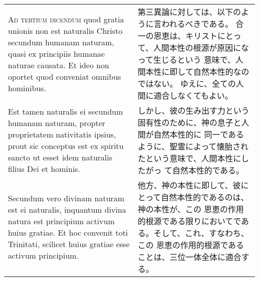 \documentclass[10pt]{jsarticle} %
\begin{document}
\begin{longtable}{p{21em}p{21em}}
\\



{\scshape Ad tertium dicendum} quod gratia unionis non est naturalis Christo
secundum humanam naturam, quasi ex principiis humanae naturae
causata. Et ideo non oportet quod conveniat omnibus hominibus.


&

第三異論に対しては、以下のように言われるべきである。
合一の恩恵は、キリストにとって、人間本性の根源が原因になって生じるという
 意味で、人間本性に即して自然本性的なのではない。
ゆえに、全ての人間に適合しなくてもよい。

\\

 Est tamen
naturalis ei secundum humanam naturam, propter proprietatem nativitatis
ipsius, prout sic conceptus est ex spiritu sancto ut esset idem
 naturalis filius Dei et hominis. 



&

しかし、彼の生み出す力という固有性のために、神の息子と人間が自然本性的に
 同一であるように、聖霊によって懐胎されたという意味で、人間本性にしたがっ
 て自然本性的である。


\\

Secundum vero divinam naturam
est ei naturalis, inquantum divina natura est principium activum huius
gratiae. Et hoc convenit toti Trinitati, scilicet huius gratiae esse
activum principium.


&

他方、神の本性に即して、彼にとって自然本性的であるのは、神の本性が、この
 恩恵の作用的根源である限りにおいてである。そして、これ、すなわち、この
 恩恵の作用的根源であることは、三位一体全体に適合する。


\end{longtable}
\end{document}
